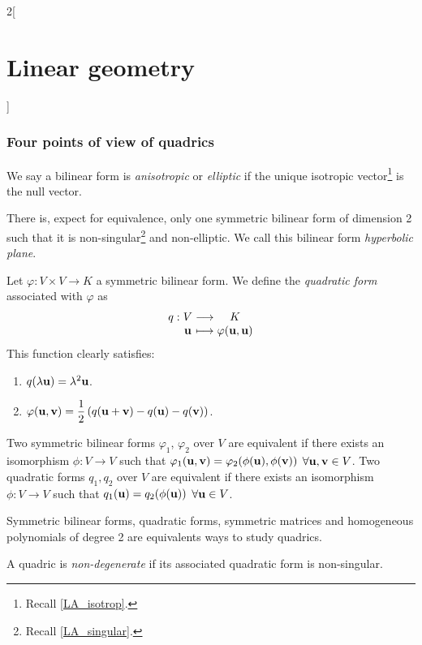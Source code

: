 \documentclass[../../../main_math.tex]{subfiles}
\begin{document}
\begin{multicols}{2}[\section{Linear geometry}]
  \subsubsection{Four points of view of quadrics}
  \begin{definition}
    We say a bilinear form is \emph{anisotropic} or \emph{elliptic} if the unique isotropic vector\footnote{Recall \cref{LA_isotrop}.} is the null vector.
  \end{definition}
  \begin{theorem}
    There is, expect for equivalence, only one symmetric bilinear form of dimension 2 such that it is non-singular\footnote{Recall \cref{LA_singular}.} and non-elliptic. We call this bilinear form \emph{hyperbolic plane}.
  \end{theorem}
  \begin{definition}
    Let $\varphi:V\times V\rightarrow K$ a symmetric bilinear form. We define the \emph{quadratic form} associated with $\varphi$ as
    $$
      \function{q}{V}{K}{\vf{u}}{\varphi(\vf{u},\vf{u})}
    $$
    This function clearly satisfies:
    \begin{enumerate}
      \item $q(\lambda\boldsymbol{\mathrm{u}})=\lambda^2\boldsymbol{\mathrm{u}}$.
      \item $\displaystyle\varphi(\boldsymbol{\mathrm{u}},\boldsymbol{\mathrm{v}})=\frac{1}{2}\left(q(\boldsymbol{\mathrm{u}}+\boldsymbol{\mathrm{v}})-q(\boldsymbol{\mathrm{u}})-q(\boldsymbol{\mathrm{v}})\right)$.
    \end{enumerate}
  \end{definition}
  \begin{proposition}
    Two symmetric bilinear forms $\varphi_1$, $\varphi_2$ over $V$ are equivalent if there exists an isomorphism $\phi:V\rightarrow V$ such that $\varphi_1(\boldsymbol{\mathrm{u}},\boldsymbol{\mathrm{v}})=\varphi_2(\phi(\boldsymbol{\mathrm{u}}),\phi(\boldsymbol{\mathrm{v}}))$ $\forall\boldsymbol{\mathrm{u}},\boldsymbol{\mathrm{v}}\in V$.\newline
    Two quadratic forms $q_1,q_2$ over $V$ are equivalent if there exists an isomorphism $\phi:V\rightarrow V$ such that $q_1(\boldsymbol{\mathrm{u}})=q_2(\phi(\boldsymbol{\mathrm{u}}))$ $\forall\boldsymbol{\mathrm{u}}\in V$.
  \end{proposition}
  \begin{theorem}
    Symmetric bilinear forms, quadratic forms, symmetric matrices and homogeneous polynomials of degree 2 are equivalents ways to study quadrics.
  \end{theorem}
  \begin{definition}
    A quadric is \emph{non-degenerate} if its associated quadratic form is non-singular.
  \end{definition}

\end{multicols}
\end{document}
